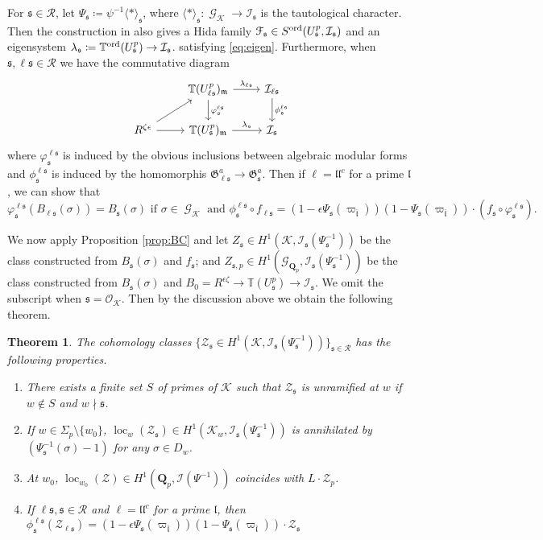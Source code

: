 \documentclass[leqno]{amsart}
\newtheorem{thm}{Theorem}[section]
\theoremstyle{definition}
\theoremstyle{remark}
\newcommand{\oo}{\mathcal{O}}
\newcommand{\Qp}{\mathbf{Q}_p}
\DeclareMathOperator{\Gal}{\mathcal{G}}
\newcommand{\fl}{\mathfrak{l}}
\newcommand{\fm}{\mathfrak{m}}
\newcommand{\fs}{\mathfrak{s}}
\newcommand{\Gp}{\mathcal{G}_{\Qp}} %
\newcommand{\K}{{\mathcal{K}}} %
\newcommand{\fG}{\mathfrak{G}}
\newcommand{\TT}{\mathbb{T}} %
\newcommand{\euF}{\EuScript{F}} %
\newcommand{\I}{\mathcal{I}} %
\newcommand{\ord}{\textnormal{ord}} %
\DeclareMathOperator{\loc}{loc}
\begin{document}
For $\fs\in \mathcal{R}$, 
let $\Psi_\fs\coloneqq \psi^{-1}\langle*\rangle_\fs$,
where $\langle*\rangle_\fs\colon \Gal_\K\to \I_\fs$ 
is the tautological character.
Then the construction in \cite{lee} also gives a Hida family
$\euF_\fs\in S^{\ord}(U^p_\fs,\I_\fs)$ and 
an eigensystem $\lambda_\fs\coloneqq \TT^{\ord}(U^p_\fs)\to \I_\fs$.
satisfying \eqref{eq:eigen}.
Furthermore, when $\fs, \ell\fs\in \mathcal{R}$
we have the commutative diagram
\[
\begin{tikzcd}
	& \TT(U^p_{\ell\fs})_\fm
    \arrow[d,"\varphi^{\ell\fs}_\fs"] \arrow[r,"\lambda_{\ell\fs}"]
    &\I_{\ell\fs} \arrow[d,"\phi^{\ell\fs}_\fs"]\\
	R^{\zeta\epsilon}\arrow[r]\arrow[ur]
	& \TT(U^p_\fs)_\fm \arrow[r,"\lambda_{\fs}"] &
    \I_\fs
\end{tikzcd}
\]
where $\varphi^{\ell\fs}_\fs$ is induced by the obvious inclusions
between algebraic modular forms and $\phi^{\ell\fs}_\fs$
is induced by the homomorphis $\fG^a_{\ell\fs}\to\fG^a_{\fs}$.
Then if $\ell=\fl\fl^c$ for a prime $\fl$, we can show that 
\[
\varphi^{\ell\fs}_\fs(B_{\ell\fs}(\sigma))=B_\fs(\sigma)
    \text{ if }\sigma\in\Gal_\K
    \text{ and }
    \phi^{\ell\fs}_\fs\circ f_{\ell\fs}=
    (1-\epsilon\Psi_{\fs}(\varpi_{\bar{\fl}}))
    (1-\Psi_\fs(\varpi_{\bar{\fl}}))
    \cdot (f_\fs\circ \varphi^{\ell\fs}_\fs).
\]

We now apply Proposition \ref{prop:BC} and
let $Z_\fs\in H^1(\K,\I_\fs(\Psi_\fs^{-1}))$
be the class constructed from 
$B_\fs(\sigma)$ and $f_\fs$; and
$Z_{\fs,p}\in H^1(\Gp,\I_\fs(\Psi_\fs^{-1}))$
be the class constructed from 
$B_\fs(\sigma)$ and $B_0=R^{\epsilon\zeta}\to \TT(U^p_\fs)\to\I_\fs$.
We omit the subscript when $\fs=\oo_\K$.
Then by the discussion above we obtain the following theorem.

\begin{thm}\label{thm:Bigeu}
The cohomology classes
$\{\mathcal{Z}_\fs\in H^1(\K, \I_\fs(\Psi_\fs^{-1}))\}_{\fs\in\mathcal{R}}$
has the following properties.
\begin{enumerate}
    \item There exists a finite set $S$ of primes of $\K$ such that 
    $\mathcal{Z}_{\fs}$ is unramified at $w$ if $w\notin S$ and 
    $w\nmid \fs$.
    \item If $w\in \Sigma_p\setminus\{w_0\}$, 
    $\loc_{w}(\mathcal{Z}_\fs)\in H^1(\K_{w}, \I_\fs(\Psi_\fs^{-1}))$
    is annihilated by $(\Psi_{\fs}^{-1}(\sigma)-1)$
    for any $\sigma\in D_{w}$.
    \item At $w_0$,
    $\loc_{w_0}(\mathcal{Z})\in H^1(\Qp, \I(\Psi^{-1}))$ coincides with
    $L\cdot \mathcal{Z}_{p}$.
    \item If $\ell\fs,\fs\in \mathcal{R}$ and $\ell=\fl\fl^c$
    for a prime $\fl$, then
    $\phi^{\ell\fs}_\fs(\mathcal{Z}_{\ell\fs})=
    (1-\epsilon\Psi_{\fs}(\varpi_{\bar{\fl}}))
    (1-\Psi_\fs(\varpi_{\bar{\fl}}))\cdot 
    \mathcal{Z}_{\fs}$
\end{enumerate}
\end{thm}
\end{document}
